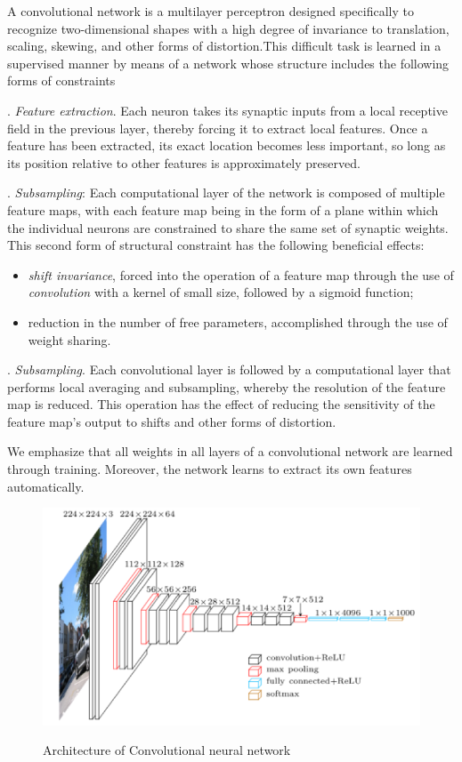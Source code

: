 \documentclass[12pt]{article}
\begin{document}
    A convolutional network is a multilayer perceptron designed specifically to recognize
two-dimensional shapes with a high degree of invariance to translation, scaling, skewing, and other forms of distortion.This difficult task is learned in a supervised manner by means of a network whose structure includes the following forms of constraints
  
. \textit{Feature extraction}. Each neuron takes its synaptic inputs from a local receptive
field in the previous layer, thereby forcing it to extract local features. Once a feature
has been extracted, its exact location becomes less important, so long as its position relative
to other features is approximately preserved.

    . \textit{Subsampling}: Each computational layer of the network is composed of multiple feature maps, with each feature map being in the form of a plane within which the individual neurons are constrained to share the same set of synaptic weights. This second form of structural constraint has the following beneficial effects:
    \begin{itemize}
  \item \textit{shift invariance}, forced into the operation of a feature map through the use of \textit{convolution} with a kernel of small size, followed by a sigmoid function;
  \item reduction in the number of free parameters, accomplished through the use of weight sharing.
\end{itemize}
    
    . \textit{Subsampling}. Each convolutional layer is followed by a computational layer that performs local averaging and subsampling, whereby the resolution of the feature map is reduced. This operation has the effect of reducing the sensitivity of the feature map’s output to shifts and other forms of distortion.
    
    We emphasize that all weights in all layers of a convolutional network are learned through training. Moreover, the network learns to extract its own features automatically.
    
    \begin{figure}[h]
    	\centering
    	\includegraphics[width=0.75 \textwidth]{cnn.png}
       	\label{fig:mesh8}
	\caption{Architecture of Convolutional neural network }
	\end{figure} 
    
\end{document}
